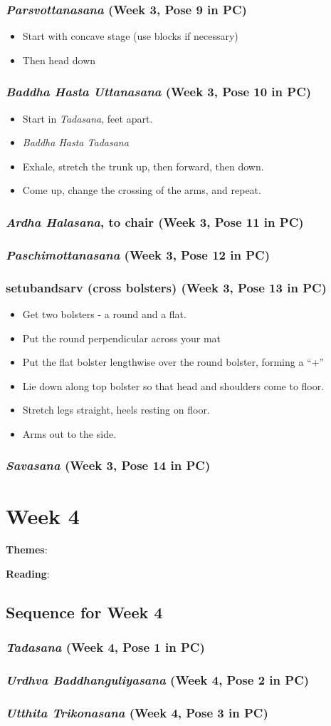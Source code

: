 \documentclass{book}
\newcommand{\apose}[1]{\emph{#1}}
\newcommand{\ardhal}{\apose{Ardha Halasana}}
\newcommand{\badhasttad}{\apose{Baddha Hasta Tadasana}}
\newcommand{\badhastutt}{\apose{Baddha Hasta Uttanasana}}
\newcommand{\parsvo}{\apose{Parsvottanasana}}
\newcommand{\paschi}{\apose{Paschimottanasana}}
\newcommand{\sav}{\apose{Savasana}}
\newcommand{\tad}{\apose{Tadasana}}
\newcommand{\urdbad}{\apose{Urdhva Baddhanguliyasana}}
\newcommand{\utttrik}{\apose{Utthita Trikonasana}}
\newcommand{\PC}[2]{{\normalfont \hfill(Week #1, Pose #2 in PC)}}
\newcommand{\newpose}[1]{{{#1}}}
\newcounter{week}
\newcounter{pose}
\newcommand{\week}[1]
{ \IfDecimal{#1}{\setcounter{week}{\integerpart}}{fooey}
  \setcounter{pose}{1}
  \chapter{Week {#1}}}
\newcommand{\pose}{\subsection}
\begin{document}
\pose{ \parsvo{} \PC{3}{9}}
  \begin{itemize}
  \item Start with concave stage (use blocks if necessary) 
  \item Then head down
  \end{itemize}

\pose{ \newpose{\badhastutt{}} \PC{3}{10}}

  \begin{itemize}
  \item Start in \tad{}, feet apart.
  \item \badhasttad{}
  \item Exhale, stretch the trunk up, then forward, then down. 
  \item Come up, change the crossing of the arms, and repeat.
  \end{itemize}

\pose{ \ardhal{}, to chair \PC{3}{11}}

\pose{ \paschi{} \PC{3}{12}}

\pose{ \newpose{setubandsarv{}} (cross bolsters) \PC{3}{13}}

  \begin{itemize}
  \item Get two bolsters - a round and a flat.
  \item Put the round perpendicular across your mat
  \item Put the flat bolster lengthwise over the round bolster,
    forming a ``+'' 
  \item Lie down along top bolster so that head and shoulders come to
    floor.  
  \item Stretch legs straight, heels resting on floor.
  \item Arms out to the side.
  \end{itemize}

\pose{ \sav{}  \PC{3}{14}}


\week{4}
\label{week:4}

\textbf{Themes}: 

\textbf{Reading}: 

\section{Sequence for Week 4}
\label{seq:4}

\pose{ \tad{} \PC{4}{1}}

\pose{ \urdbad{} \PC{4}{2}}

\pose{ \utttrik{} \PC{4}{3}}
\end{document}

